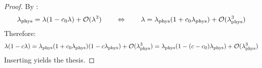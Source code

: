 \begin{proofbox}
  \begin{proof}
    By :
    \begin{equation*}
      \lambda_\text{phys} = \lambda (1 - c_0 \lambda) + \mathcal{O}(\lambda^3)
      \qquad \Leftrightarrow \qquad
      \lambda = \lambda_\text{phys} (1 + c_0 \lambda_\text{phys}) + \mathcal{O}(\lambda_\text{phys}^3)
    \end{equation*}
    Therefore:
    \begin{equation*}
      \lambda (1 - c \lambda) = \lambda_\text{phys} (1 + c_0 \lambda_\text{phys}) (1 - c \lambda_\text{phys}) + \mathcal{O}(\lambda_\text{phys}^3) = \lambda_\text{phys} (1 - (c - c_0) \lambda_\text{phys}) + \mathcal{O}(\lambda_\text{phys}^3)
    \end{equation*}
    Inserting  yields the thesis.
  \end{proof}
\end{proofbox}


